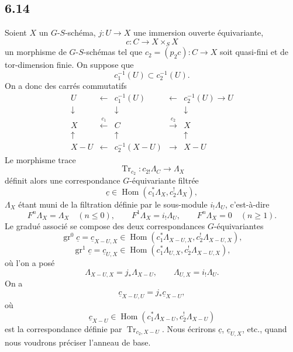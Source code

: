 \documentclass[11pt]{article}
\DeclareMathOperator{\Hom}{Hom}
\providecommand{\Tr}{\operatorname{Tr}}
\providecommand{\Tr}{\operatorname{Tr}}
\providecommand{\Tr}{\operatorname{Tr}}
\providecommand{\Hom}{\operatorname{Hom}}
\begin{document}
\subsection*{6.14}
Soient $X$ un $G$-$S$-schéma, $j:U\to X$ une immersion ouverte équivariante,
\[
c:C\to X\times_SX
\]
un morphisme de $G$-$S$-schémas tel que $c_2=(p_2c):C\to X$ soit quasi-fini et de tor-dimension finie. On suppose que
\[
c_1^{-1}(U)\subset c_2^{-1}(U).
\]
On a donc des carrés commutatifs
\begin{equation}
\begin{array}{ccccc}
U & \longleftarrow & c_1^{-1}(U) & \longleftarrow & c_2^{-1}(U)\longrightarrow U\\
\downarrow && \downarrow && \downarrow\\
X & \xleftarrow{\,c_1\,} & C & \xrightarrow{\,c_2\,} & X\\
\uparrow && \uparrow && \uparrow\\
X-U & \longleftarrow & c_2^{-1}(X-U) & \longrightarrow & X-U
\end{array}
\tag{6.14.1}
\end{equation}
Le morphisme trace
\[
\Tr_{c_2}:c_{2!}\Lambda_C\longrightarrow \Lambda_X
\]
définit alors une correspondance $G$-équivariante filtrée
\begin{equation}
\underline c\in\Hom(c_1^*\Lambda_X,c_2^!\Lambda_X),
\tag{6.14.2}
\end{equation}
$\Lambda_X$ étant muni de la filtration définie par le sous-module $i_!\Lambda_U$, c'est-à-dire
\[
F^n\Lambda_X=\Lambda_X\quad(n\le0),\qquad
F^1\Lambda_X=i_!\Lambda_U,\qquad
F^n\Lambda_X=0\quad(n\ge1).
\]
Le gradué associé se compose des deux correspondances $G$-équivariantes
\[
\operatorname{gr}^0\underline c=\underline c_{X-U,X}
\in\Hom(c_1^*\Lambda_{X-U,X},c_2^!\Lambda_{X-U,X}),
\]
\begin{equation}
\operatorname{gr}^1\underline c=\underline c_{U,X}
\in\Hom(c_1^*\Lambda_{U,X},c_2^!\Lambda_{X-U,X}),
\tag{6.14.3}
\end{equation}
où l'on a posé
\[
\Lambda_{X-U,X}=j_*\Lambda_{X-U},\qquad
\Lambda_{U,X}=i_!\Lambda_U.
\]
On a
\begin{equation}
\underline c_{X-U,U}=j_*\underline c_{X-U},
\tag{6.14.4}
\end{equation}
où
\[
\underline c_{X-U}\in\Hom(c_1^*\Lambda_{X-U},c_2^!\Lambda_{X-U})
\]
est la correspondance définie par $\Tr_{c_2,X-U}$. Nous écrirons $\underline c$, $\underline c_{U,X}$, etc., quand nous voudrons préciser l'anneau de base.
\end{document}
